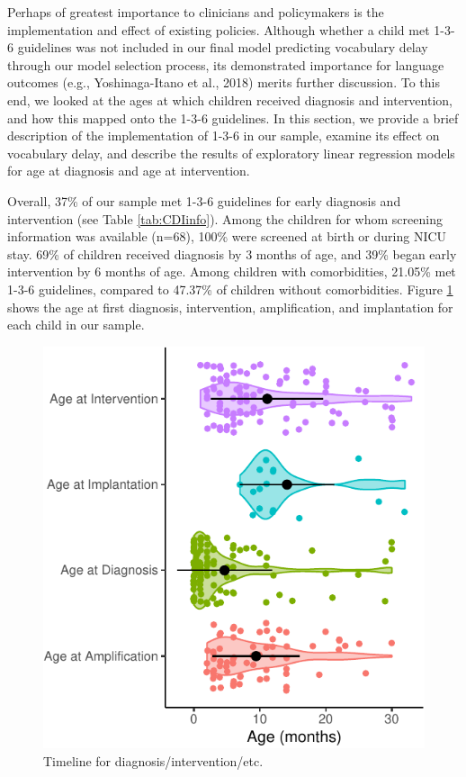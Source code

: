 \documentclass[
  english,
  man]{apa6}
\begin{document}
Perhaps of greatest importance to clinicians and policymakers is the implementation and effect of existing policies. Although whether a child met 1-3-6 guidelines was not included in our final model predicting vocabulary delay through our model selection process, its demonstrated importance for language outcomes (e.g., Yoshinaga-Itano et al., 2018) merits further discussion. To this end, we looked at the ages at which children received diagnosis and intervention, and how this mapped onto the 1-3-6 guidelines. In this section, we provide a brief description of the implementation of 1-3-6 in our sample, examine its effect on vocabulary delay, and describe the results of exploratory linear regression models for age at diagnosis and age at intervention.

Overall, 37\% of our sample met 1-3-6 guidelines for early diagnosis and intervention (see Table \ref{tab:CDIinfo}). Among the children for whom screening information was available (n=68), 100\% were screened at birth or during NICU stay. 69\% of children received diagnosis by 3 months of age, and 39\% began early intervention by 6 months of age. Among children with comorbidities, 21.05\% met 1-3-6 guidelines, compared to 47.37\% of children without comorbidities. Figure \ref{fig:meets136-timeline} shows the age at first diagnosis, intervention, amplification, and implantation for each child in our sample.

\begin{figure}
\centering
\includegraphics{ELSSP_paper_files/figure-latex/meets136-timeline-1.pdf}
\caption{\label{fig:meets136-timeline}Timeline for diagnosis/intervention/etc.}
\end{figure}
\end{document}
